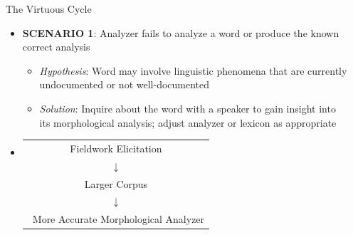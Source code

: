 \documentclass[usenames,dvipsnames]{beamer}
\begin{document}
\begin{frame}[fragile]
\begin{columns}
\begin{column}{0.3\textwidth}
\begin{block}{The Virtuous Cycle}

\begin{itemize}
\setlength\itemsep{48pt}
    \item \textbf{SCENARIO 1}: Analyzer fails to analyze a word or produce the known correct analysis
    \vspace{24pt}
    \begin{itemize}
    \setlength\itemsep{24pt}
    \item \textit{Hypothesis}: Word may involve linguistic phenomena that are currently undocumented or not well-documented
            
    \item \textit{Solution}: Inquire about the word with a speaker to gain insight into its morphological analysis; adjust analyzer or lexicon as appropriate
    \end{itemize}
    
    \item
    \begin{tabular}[t]{c}
    Fieldwork Elicitation \\
    $\downarrow$ \\
    Larger Corpus \\
    $\downarrow$ \\\
    More Accurate Morphological Analyzer
    \end{tabular}
\end{itemize}

\end{block}
\end{column}

\begin{column}{0.3\textwidth}
\hspace*{24pt}



\end{column}
\end{columns}
\end{frame}
\end{document}
